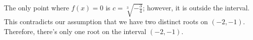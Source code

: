 \documentclass[a4paper, 12pt]{article}
\begin{document}
\begin{enumerate}[leftmargin=*,label=\textbf{\arabic*.}]
The only point where $f(x)=0$ is $c=\sqrt[3]{-\frac{3}{4}}$; however, it is outside the interval. This contradicts our assumption that we have two distinct roots on $(-2, -1)$. Therefore, there's only one root on the interval $(-2,-1)$.

\end{enumerate}
\end{document}
